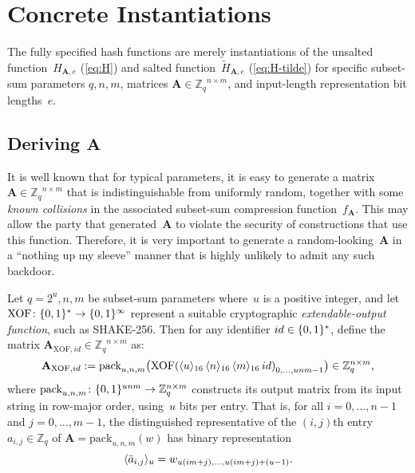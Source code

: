 \documentclass[11pt]{article}
\newcommand{\Z}{\ensuremath{\mathbb{Z}}}
\newcommand{\Zq}{\ensuremath{\Z_q}}
\DeclarePairedDelimiter\inner{\langle}{\rangle}
\DeclarePairedDelimiter\set{\{}{\}}
\DeclarePairedDelimiter\parens{(}{)}
\newcommand{\matA}{\ensuremath{\mathbf{A}}}
\numberwithin{equation}{section}
\newcommand{\bit}{\ensuremath{\set{0,1}}}
\begin{document}



\section{Concrete Instantiations}
\label{sec:instantiations}

\newcommand{\xof}{\text{XOF}}
\newcommand{\pack}{\text{pack}}

The fully specified hash functions are merely instantiations of the
unsalted function~$H_{\matA,e}$ (\cref{eq:H}) and salted
function~$\tilde{H}_{\matA,e}$ (\cref{eq:H-tilde}) for specific
subset-sum parameters $q, n, m$, matrices
$\matA \in \Zq^{n \times m}$, and input-length representation bit
lengths~$e$.

\subsection{Deriving $\matA$}
\label{sec:deriving-A}

It is well known that for typical parameters, it is easy to generate a
matrix $\matA \in \Zq^{n \times m}$ that is indistinguishable from
uniformly random, together with some \emph{known collisions} in the
associated subset-sum compression function~$f_{\matA}$. This may allow
the party that generated~$\matA$ to violate the security of
constructions that use this function. Therefore, it is very important
to generate a random-looking~$\matA$ in a ``nothing up my sleeve''
manner that is highly unlikely to admit any such backdoor.

Let $q=2^{u}, n, m$ be subset-sum parameters where~$u$ is a positive
integer, and let $\xof \colon \bit^{*} \to \bit^{\infty}$ represent a
suitable cryptographic \emph{extendable-output function}, such as
SHAKE-256. Then for any identifier $id \in \bit^{*}$, define the
matrix $\matA_{\xof, id} \in \Zq^{n \times m}$ as:
\begin{equation}
  \label{eq:A_XOF}
  \matA_{\xof,id} := \pack_{u,n,m}\parens[\big]{ \xof
    \parens*{\inner{u}_{16}\, \inner{n}_{16}\,
      \inner{m}_{16}\, id}_{0, \ldots, unm-1}} \in \Zq^{n \times m} \text{,}
\end{equation}
where $\pack_{u,n,m} \colon \bit^{u n m} \to \Zq^{n \times m}$
constructs its output matrix from its input string in row-major order,
using~$u$ bits per entry. That is, for all $i = 0, \ldots, n-1$ and
$j = 0, \ldots, m-1$, the distinguished representative of the
$(i,j)$th entry~$a_{i,j} \in \Zq$ of $\matA = \pack_{u,n,m}(w)$ has
binary representation
\[ \inner{\bar{a}_{i,j}}_{u} = w_{u(im+j), \ldots, u(im+j) + (u-1)}
  \text{.} \]
\end{document}
